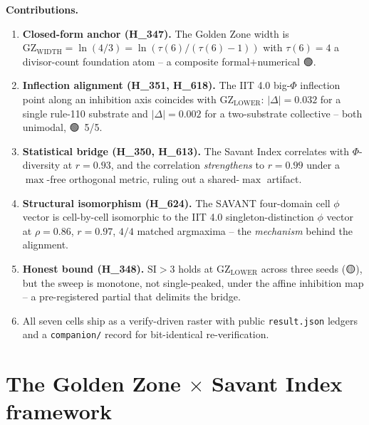 \documentclass[11pt,a4paper]{article}
\providecommand{\tierGreen}{🟢}
\providecommand{\tierYellow}{🟡}
\newcommand{\GZL}{\mathrm{GZ_{LOWER}}}
\newcommand{\GZW}{\mathrm{GZ_{WIDTH}}}
\newcommand{\Svi}{\mathrm{SI}}
\begin{document}
\medskip
\noindent\textbf{Contributions.}
\begin{enumerate}\itemsep0.3em
\item \textbf{Closed-form anchor (H\_347).} The Golden Zone width is
      $\GZW = \ln(4/3) = \ln(\tau(6)/(\tau(6)-1))$ with
      $\tau(6)=4$ a divisor-count foundation atom -- a composite
      formal$+$numerical \tierGreen.
\item \textbf{Inflection alignment (H\_351, H\_618).} The IIT 4.0 big-$\Phi$
      inflection point along an inhibition axis coincides with $\GZL$:
      $|\Delta|=0.032$ for a single rule-110 substrate and $|\Delta|=0.002$
      for a two-substrate collective -- both unimodal, \tierGreen\ 5/5.
\item \textbf{Statistical bridge (H\_350, H\_613).} The Savant Index
      correlates with $\Phi$-diversity at $r=0.93$, and the correlation
      \emph{strengthens} to $r=0.99$ under a $\max$-free orthogonal metric,
      ruling out a shared-$\max$ artifact.
\item \textbf{Structural isomorphism (H\_624).} The SAVANT four-domain cell
      $\phi$ vector is cell-by-cell isomorphic to the IIT 4.0
      singleton-distinction $\phi$ vector at $\rho=0.86$, $r=0.97$, $4/4$
      matched argmaxima -- the \emph{mechanism} behind the alignment.
\item \textbf{Honest bound (H\_348).} $\Svi>3$ holds at $\GZL$ across three
      seeds (\tierYellow), but the sweep is monotone, not single-peaked,
      under the affine inhibition map -- a pre-registered partial that
      delimits the bridge.
\item All seven cells ship as a verify-driven raster with public
      \texttt{result.json} ledgers and a \texttt{companion/} record for
      bit-identical re-verification.
\end{enumerate}

\section{The Golden Zone $\times$ Savant Index framework}
\label{sec:gzsi}
\end{document}
